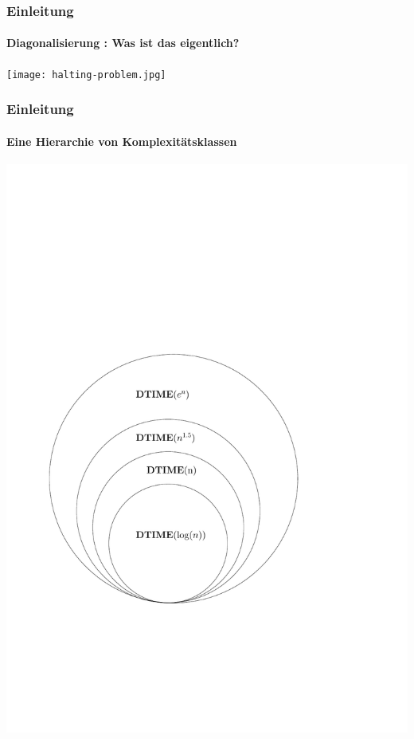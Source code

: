 \begin{frame}
	\frametitle{Einleitung}
	\framesubtitle{Diagonalisierung : Was ist das eigentlich?}
	
	\texttt{[image: halting-problem.jpg]}
\end{frame}
\begin{frame}
	\frametitle{Einleitung}
	\framesubtitle{Eine Hierarchie von Komplexitätsklassen}
	\includegraphics[scale=0.5]{images/timehierarchy.pdf}
\end{frame}
